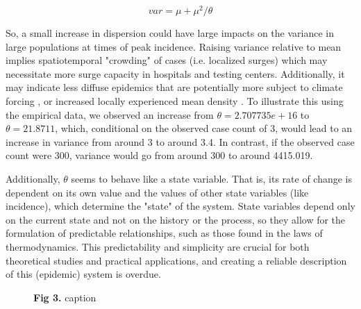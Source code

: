 \documentclass[10pt,letterpaper]{article}
\begin{document}
\begin{equation}
var = \mu + \mu^2/\theta  
\end{equation}

So, a small increase in dispersion could have large impacts on the variance in large populations at times of peak incidence. 
Raising variance relative to mean implies spatiotemporal "crowding" of cases (i.e. localized surges) which may necessitate more surge capacity in hospitals and testing centers. 
Additionally, it may indicate less diffuse epidemics that are potentially more subject to climate forcing \cite{dalziel_urbanization_2018}, or increased locally experienced mean density \cite{lloyd_mean_1967}. To illustrate this using the empirical data, we observed an increase from \begin{math}\theta = 2.707735e+16\end{math} to \begin{math}\theta = 21.8711\end{math}, which, conditional on the observed case count of 3, would lead to an increase in variance from around 3 to around 3.4. In contrast, if the observed case count were 300, variance would go from around 300 to around 4415.019.

Additionally, \begin{math}\theta\end{math} seems to behave like a state variable. That is, its rate of change is dependent on its own value and the values of other state variables (like incidence), which determine the "state" of the system. State variables depend only on the current state and not on the history or the process, so they allow for the formulation of predictable relationships, such as those found in the laws of thermodynamics. This predictability and simplicity are crucial for both theoretical studies and practical applications, and creating a reliable description of this (epidemic) system is overdue.

\begin{figure}[!h]
\caption{{\bf Fig 3.}
caption
}
\label{fig3}
\end{figure}
\end{document}
